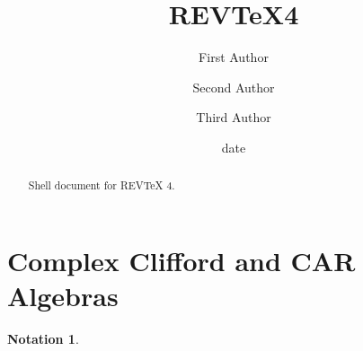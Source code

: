 \documentclass[aps,preprint]{revtex4}
\newtheorem{notation}[theorem]{Notation}
\begin{document}
\title[Short title for running header]{REV\TeX4}
\author{First Author}
\author{Second Author}
\author{Third Author}

\begin{abstract}
Shell document for REV\TeX{} 4.
\end{abstract}

\date[Date text]{date}
\maketitle
\tableofcontents

\part{Complex Clifford and CAR Algebras}

\begin{notation}
\end{notation}
\end{document}
